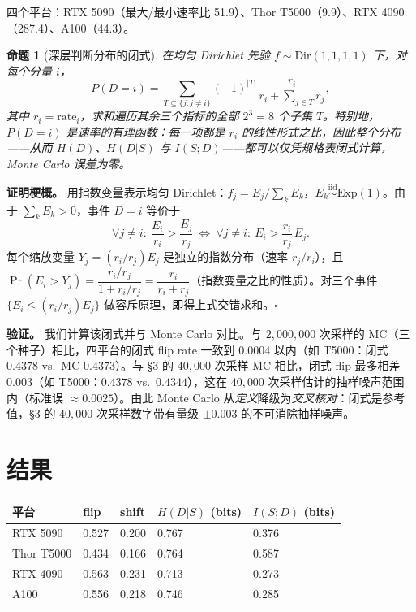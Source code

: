 \documentclass[10pt]{article}
\newtheorem{proposition}{命题}
\begin{document}
四个平台：RTX 5090（最大/最小速率比 51.9）、Thor T5000（9.9）、RTX 4090（287.4）、A100（44.3）。

\begin{proposition}[深层判断分布的闭式]\label{prop:closedform}
在均匀 Dirichlet 先验 $f\sim\mathrm{Dir}(1,1,1,1)$ 下，对每个分量 $i$，
\[
P(D=i)=\sum_{T\subseteq\{j:j\neq i\}} (-1)^{|T|}\,\frac{r_i}{r_i+\sum_{j\in T} r_j},
\]
其中 $r_i=\mathrm{rate}_i$，求和遍历其余三个指标的全部 $2^{3}=8$ 个子集 $T$。特别地，$P(D=i)$ 是\emph{速率的有理函数}：每一项都是 $r_i$ 的线性形式之比，因此整个分布——从而 $H(D)$、$H(D|S)$ 与 $I(S;D)$——都可以仅凭规格表闭式计算，Monte Carlo 误差为零。
\end{proposition}

\textbf{证明梗概。} 用指数变量表示均匀 Dirichlet：$f_j=E_j/\sum_k E_k$，$E_k\stackrel{\mathrm{iid}}{\sim}\mathrm{Exp}(1)$。由于 $\sum_k E_k>0$，事件 $D=i$ 等价于
\[
\forall j\neq i:\ \frac{E_i}{r_i}>\frac{E_j}{r_j}\ \Longleftrightarrow\ \forall j\neq i:\ E_i > \frac{r_i}{r_j}\,E_j .
\]
每个缩放变量 $Y_j=(r_i/r_j)E_j$ 是独立的指数分布（速率 $r_j/r_i$），且 $\Pr(E_i>Y_j)=\dfrac{r_i/r_j}{1+r_i/r_j}=\dfrac{r_i}{r_i+r_j}$（指数变量之比的性质）。对三个事件 $\{E_i\le (r_i/r_j)E_j\}$ 做容斥原理，即得上式交错求和。$\square$

\textbf{验证。} 我们计算该闭式并与 Monte Carlo 对比。与 $2{,}000{,}000$ 次采样的 MC（三个种子）相比，四平台的闭式 flip rate 一致到 $0.0004$ 以内（如 T5000：闭式 $0.4378$ vs.\ MC $0.4373$）。与 §3 的 $40{,}000$ 次采样 MC 相比，闭式 flip 最多相差 $0.003$（如 T5000：$0.4378$ vs.\ $0.4344$），这在 $40{,}000$ 次采样估计的抽样噪声范围内（标准误 $\approx 0.0025$）。由此 Monte Carlo 从\emph{定义}降级为\emph{交叉核对}：闭式是参考值，§3 的 $40{,}000$ 次采样数字带有量级 $\pm 0.003$ 的不可消除抽样噪声。

\section{结果}\label{results}

\begin{longtable}[]{@{}lllll@{}}
\toprule\noalign{}
平台 & flip & shift & $H(D|S)$ (bits) & $I(S;D)$ (bits) \\
\midrule\noalign{}
\endhead
\bottomrule\noalign{}
\endlastfoot
RTX 5090 & 0.527 & 0.200 & 0.767 & 0.376 \\
Thor T5000 & 0.434 & 0.166 & 0.764 & 0.587 \\
RTX 4090 & 0.563 & 0.231 & 0.713 & 0.273 \\
A100 & 0.556 & 0.218 & 0.746 & 0.285 \\
\end{longtable}
\end{document}
